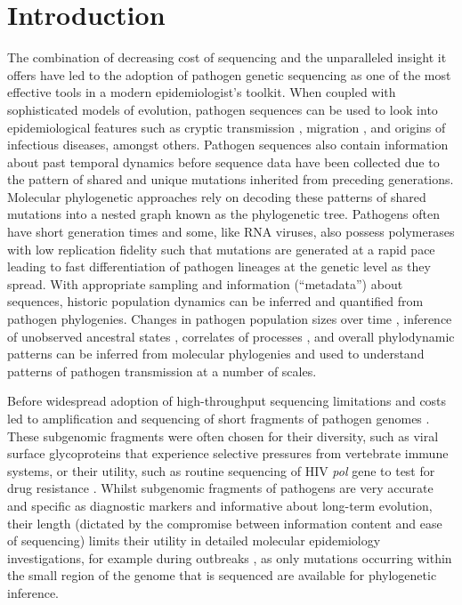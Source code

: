 \documentclass{bmcart}
\begin{document}
%
%
\section*{Introduction}

The combination of decreasing cost of sequencing and the unparalleled insight it offers have led to the adoption of pathogen genetic sequencing as one of the most effective tools in a modern epidemiologist's toolkit.
When coupled with sophisticated models of evolution, pathogen sequences can be used to look into epidemiological features such as cryptic transmission \cite{faria_establishment_2017}, migration \cite{lemey_bayesian_2009,lemey_unifying_2014}, and origins \cite{smith_origins_2009} of infectious diseases, amongst others.
Pathogen sequences also contain information about past temporal dynamics before sequence data have been collected \cite{raghwani_origin_2012} due to the pattern of shared and unique mutations inherited from preceding generations.
Molecular phylogenetic approaches rely on decoding these patterns of shared mutations into a nested graph known as the phylogenetic tree.
Pathogens often have short generation times and some, like RNA viruses, also possess polymerases with low replication fidelity such that mutations are generated at a rapid pace \cite{drummond_measurably_2003,biek_measurably_2015} leading to fast differentiation of pathogen lineages at the genetic level as they spread.
With appropriate sampling and information (``metadata'') about sequences, historic population dynamics can be inferred and quantified from pathogen phylogenies.
Changes in pathogen population sizes over time \cite{pybus_integrated_2000}, inference of unobserved ancestral states \cite{lemey_bayesian_2009,dudas_mers-cov_2018}, correlates of processes \cite{faria_simultaneously_2013,lemey_unifying_2014,dudas_virus_2017}, and overall phylodynamic \cite{grenfell_unifying_2004} patterns can be inferred from molecular phylogenies and used to understand patterns of pathogen transmission at a number of scales.

Before widespread adoption of high-throughput sequencing limitations and costs led to amplification and sequencing of short fragments of pathogen genomes \cite{jin_genetic_1999,jin_proposal_2005}.
These subgenomic fragments were often chosen for their diversity, such as viral surface glycoproteins that experience selective pressures from vertebrate immune systems, or their utility, such as routine sequencing of HIV \textit{pol} gene to test for drug resistance \cite{kaye_phylogenetic_2008,rhee_human_2003}.
Whilst subgenomic fragments of pathogens are very accurate and specific as diagnostic markers and informative about long-term evolution, their length (dictated by the compromise between information content and ease of sequencing) limits their utility in detailed molecular epidemiology investigations, for example during outbreaks \cite{wohl_co-circulating_2018}, as only mutations occurring within the small region of the genome that is sequenced are available for phylogenetic inference.
\end{document}
